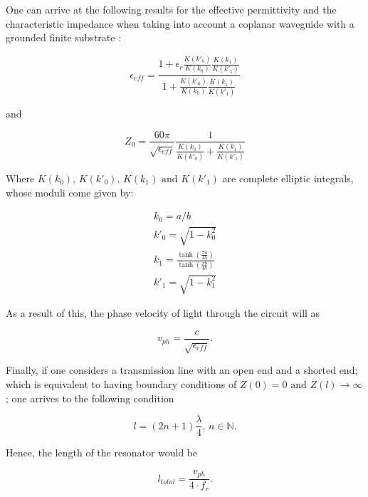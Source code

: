 \documentclass[12pt, a4paper]{article}
\begin{document}
One can arrive at the following results for the effective permittivity and the characteristic impedance when taking into account a coplanar waveguide with a grounded finite substrate \cite{Wadell1991}:

\begin{equation}
    \label{permittivity}
    \epsilon_{eff} = \frac{1 + \epsilon_{r} \frac{K(k'_0)}{K(k_0)} \frac{K(k_1)}{K(k'_1)}}{1 + \frac{K(k'_0)}{K(k_0)} \frac{K(k_1)}{K(k'_1)}}
\end{equation}

and

\begin{equation}
    \label{impedance}
    Z_0 = \frac{60\pi}{\sqrt{\epsilon_{eff}}}\frac{1}{\frac{K(k_0)}{K(k'_0)} + \frac{K(k_1)}{K(k'_1)}}
\end{equation}

Where $K(k_0)\text{, }K(k'_0)\text{, }K(k_1) \text{ and } K(k'_1)$ are complete elliptic integrals, whose moduli come given by:

\begin{subequations} \label{k_definition}
\begin{align}
    \label{ElipModulus}
    k_0 = a/b \\
    k'_0 = \sqrt{1 - k_0^2} \\
    k_1 = \frac{\tanh\left(\frac{\pi a}{4h}\right)}{\tanh\left(\frac{\pi b}{4h}\right)} \\
    k'_1 = \sqrt{1 - k_1^2}
\end{align}
\end{subequations}

As a result of this, the phase velocity of light through the circuit will as

\begin{equation}
    \label{vph}
    v_{ph} = \frac{c}{\sqrt{\epsilon_{eff}}}.
\end{equation}

Finally, if one considers a transmission line with an open end and a shorted end; which is equivalent to having boundary conditions of $Z(0) = 0 \text{ and } Z(l) \to \infty$; one arrives to the following condition \cite{Gao2008}

\begin{equation}
    \label{ResCond}
    l = (2n + 1) \frac{\lambda}{4}, \, n \in \mathbb{N}.
\end{equation}

Hence, the length of the resonator would be

\begin{equation}
    \label{length}
    l_{total} = \frac{v_{ph}}{4 \cdot f_r}.
\end{equation}
\end{document}
